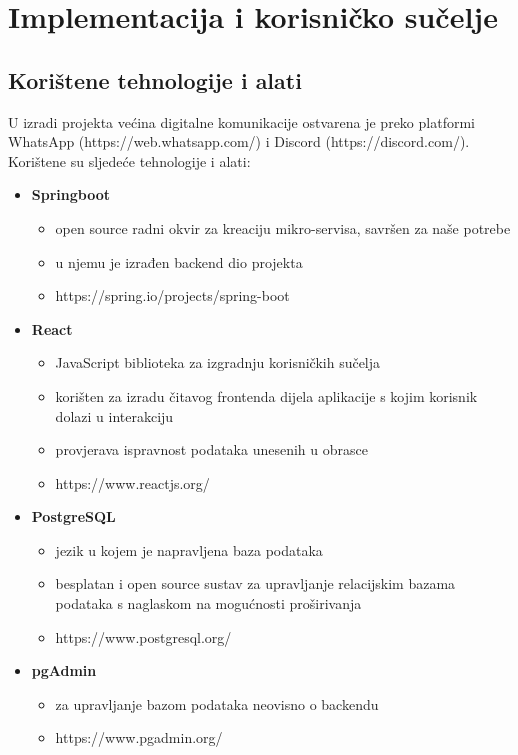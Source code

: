 \chapter{Implementacija i korisničko sučelje}
		
		
		\section{Korištene tehnologije i alati}
		
			\indent U izradi projekta većina digitalne komunikacije ostvarena je preko platformi WhatsApp (https://web.whatsapp.com/) i Discord (https://discord.com/). Korištene su sljedeće tehnologije i alati:
			
			\begin{itemize}
				\item \textbf{Springboot}
				\begin{itemize}
					\item open source radni okvir za kreaciju mikro-servisa, savršen za naše potrebe
					\item u njemu je izrađen backend dio projekta
					\item https://spring.io/projects/spring-boot
				\end{itemize}
				
				\item \textbf{React}
				\begin{itemize}
					\item JavaScript biblioteka za izgradnju korisničkih sučelja
					\item korišten za izradu čitavog frontenda dijela aplikacije s kojim korisnik dolazi u interakciju
					\item provjerava ispravnost podataka unesenih u obrasce
					\item https://www.reactjs.org/
				\end{itemize}
				
				\item \textbf{PostgreSQL}
				\begin{itemize}
					\item jezik u kojem je napravljena baza podataka
					\item besplatan i open source sustav za upravljanje relacijskim bazama podataka s naglaskom na mogućnosti proširivanja
					\item https://www.postgresql.org/
				\end{itemize}
			
				\item \textbf{pgAdmin}
				\begin{itemize}
					\item za upravljanje bazom podataka neovisno o backendu
					\item https://www.pgadmin.org/
				\end{itemize}
			

\end{itemize}
